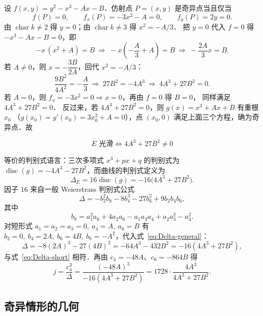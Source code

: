 \documentclass[10pt,a4paper]{article}
\numberwithin{equation}{section}
\begin{document}
设 $f(x,y)=y^{2}-x^{3}-Ax-B$．仿射点 $P=(x,y)$ 是奇异点当且仅当
\[
f(P)=0,\qquad f_{x}(P)=-3x^{2}-A=0,\qquad f_{y}(P)=2y=0 .
\]
由 $\operatorname{char}k\neq2$ 得 $y=0$；由 $\operatorname{char}k\neq3$ 得 $x^{2}=-A/3$．
把 $y=0$ 代入 $f=0$ 得 $-x^{3}-Ax-B=0$，即
\[
-x\,(x^{2}+A)=B\ \Longrightarrow\ -x\left(-\frac{A}{3}+A\right)=B
\ \Longrightarrow\ -\frac{2A}{3}x=B .
\]
若 $A\neq0$，则 $x=-\dfrac{3B}{2A}$，回代 $x^{2}=-A/3$：
\[
\frac{9B^{2}}{4A^{2}}=-\frac{A}{3}\ \Longrightarrow\ 27B^{2}=-4A^{3}
\ \Longrightarrow\ 4A^{3}+27B^{2}=0 .
\]
若 $A=0$，则 $f_{x}=-3x^{2}=0\Rightarrow x=0$，再由 $f=0$ 得 $B=0$，
同样满足 $4A^{3}+27B^{2}=0$．
反过来，若 $4A^{3}+27B^{2}=0$，则 $g(x)=x^{3}+Ax+B$ 有重根 $x_{0}$
（$g(x_{0})=g'(x_{0})=3x_{0}^{2}+A=0$），点 $(x_{0},0)$ 满足上面三个方程，确为奇异点．故

\begin{equation}\label{eq:smooth-condition}
\boxed{\;E\text{ 光滑}\iff 4A^{3}+27B^{2}\neq0\;}
\end{equation}

等价的判别式语言：三次多项式 $x^{3}+px+q$ 的判别式为
$\operatorname{disc}(g)=-4A^{3}-27B^{2}$，而曲线的判别式定义为
\begin{equation}\label{eq:Delta-short}
\Delta_{E}=16\operatorname{disc}(g)=-16\bigl(4A^{3}+27B^{2}\bigr).
\end{equation}
因子 $16$ 来自一般 Weierstrass 判别式公式
\begin{equation}\label{eq:Delta-general}
\Delta=-b_{2}^{2}b_{8}-8b_{4}^{3}-27b_{6}^{2}+9b_{2}b_{4}b_{6},
\end{equation}
其中
\begin{equation}\label{eq:b8}
b_{8}=a_{1}^{2}a_{6}+4a_{2}a_{6}-a_{1}a_{3}a_{4}+a_{2}a_{3}^{2}-a_{4}^{2}.
\end{equation}
对短形式 $a_{1}=a_{2}=a_{3}=0,\ a_{4}=A,\ a_{6}=B$ 有
$b_{2}=0,\ b_{4}=2A,\ b_{6}=4B,\ b_{8}=-A^{2}$，代入式~\eqref{eq:Delta-general}：
\[
\Delta=-8(2A)^{3}-27(4B)^{2}=-64A^{3}-432B^{2}=-16(4A^{3}+27B^{2}),
\]
与式~\eqref{eq:Delta-short} 相符．再由 $c_{4}=-48A$、$c_{6}=-864B$ 得
\begin{equation}\label{eq:j-invariant}
j=\frac{c_{4}^{3}}{\Delta}
 =\frac{(-48A)^{3}}{-16(4A^{3}+27B^{2})}
 =1728\cdot\frac{4A^{3}}{4A^{3}+27B^{2}} .
\end{equation}

\subsection{奇异情形的几何}
\end{document}

